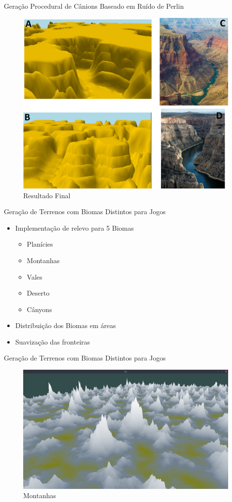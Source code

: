 \begin{frame}{Geração Procedural de Cânions Baseado em Ruído de Perlin}
  \begin{figure}
		\centering
        \includegraphics[width=.65\textwidth]{img/uffs/gabrielleResultado.png}
        \caption{Resultado Final}
  \end{figure}
\end{frame}


\begin{frame}{Geração de Terrenos com Biomas Distintos para Jogos}
  \begin{itemize}
        \item Implementação de relevo para 5 \alert{Biomas}
            \begin{itemize}
                \item Planícies
                \item Montanhas
                \item Vales
                \item Deserto
                \item Cânyons
            \end{itemize}
        \item Distribuição dos Biomas em áreas
        \item Suavização das fronteiras
    \end{itemize}
\end{frame}

\begin{frame}{Geração de Terrenos com Biomas Distintos para Jogos}
  \begin{figure}
		\centering
        \includegraphics[width=.8\textwidth]{img/uffs/bssMontains.png}
        \caption{Montanhas}
  \end{figure}
\end{frame}


